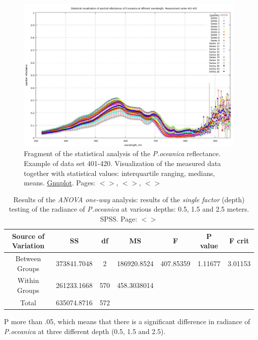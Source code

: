 \documentclass[11pt]{article}
\begin{document}
\begin{appendices}
\begin{figure}[H]
	\begin{center}
	\includegraphics[scale=0.27]{GNU-Stat-M-401-420.jpg}
	\caption{Fragment of the statistical analysis of the \textit{P.oceanica} reflectance. Example of data set 401-420. 
		Visualization of the measured data together with statistical values: interquartile ranging, medians, means. \href{http://www.gnuplot.info/}{Gnuplot}. Pages: $<$\pageref{page-21}$>$, $<$\pageref{dataprep}$>$, $<$\pageref{page-30}$>$}
	\label{fig:A.15}
	\end{center}
\end{figure}

\begin{table}[htbp]
	\caption{Results of the \textit{ANOVA one-way} analysis: results of the \textit{single factor} (depth) testing of the radiance of \textit{P.oceanica} at various depths: 0.5, 1.5 and 2.5 meters. \ac{SPSS}. Page: $<$\pageref{page-28}$>$}\label{tab:8}
	\begin{center}
	\begin{tabular}{|c|c|c|c|c|c|c|}
		\hline\hline
		\textbf{Source of Variation} & \textbf{SS} & \textbf{df} & \textbf{MS} & \textbf{F} & \textbf{P value} & \textbf{F crit} \\ \hline
		Between Groups & 373841.7048 & 2 & 186920.8524 & 407.85359 & 1.11677 & 3.01153 \\ \hline
		Within Groups & 261233.1668 & 570 & 458.3038014 & & & \\ \hline
		Total &  635074.8716 & 572 & & & & \\ \hline
	\end{tabular}
	\end{center} 
	P more than .05, which means that there is a significant difference in radiance of \textit{P.oceanica} at three different depth (0.5, 1.5 and 2.5). 
	

\end{table}
\end{appendices}
\end{document}
